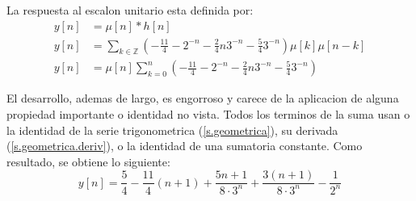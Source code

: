 \documentclass[a4paper,12pt]{report}
\begin{document}
\begin{enumerate}[label=\alph*), left=0pt]
    La respuesta al escalon unitario esta definida por:
    \begin{align*}
      y[n] &= \mu[n] * h[n]\\[6pt]
      y[n] &= \sum_{k \in \mathbb{Z}} \left(-\frac{11}{4} - 2^{-n} - \frac{2}{4} n 3^{-n} - \frac{5}{4} 3^{-n}\right) \mu[k] \mu[n-k]\\
      y[n] &= \mu[n] \sum_{k=0}^n \left(-\frac{11}{4} - 2^{-n} - \frac{2}{4} n 3^{-n} - \frac{5}{4} 3^{-n}\right)
    \end{align*}


    El desarrollo, ademas de largo, es engorroso y carece de la aplicacion de alguna propiedad importante o identidad
    no vista. Todos los terminos de la suma usan o la identidad de la serie trigonometrica (\ref{s.geometrica}), su
    derivada (\ref{s.geometrica.deriv}), o la identidad de una sumatoria constante. Como resultado, se obtiene lo
    siguiente:
    \begin{equation*}
      y[n] = \frac{5}{4} - \frac{11}{4} (n+1) + \frac{5n + 1}{8 \cdot 3^n} + \frac{3 (n+1)}{8 \cdot 3^n} -
        \frac{1}{2^n}
    \end{equation*}


\end{enumerate}
\end{document}
